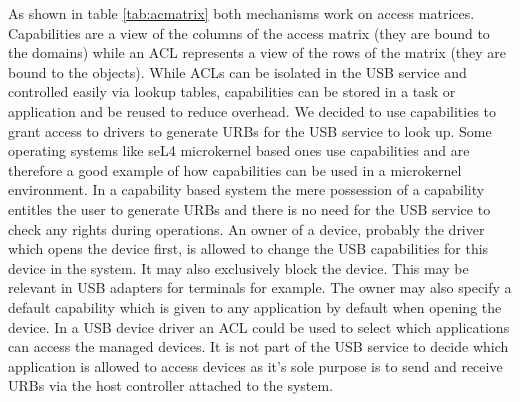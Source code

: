 \documentclass{acm_proc_article-sp}
\begin{document}
As shown in table \ref{tab:acmatrix} both mechanisms work on access matrices.
Capabilities are a view of the columns of the access matrix (they are bound to the domains) while
an ACL represents a view of the rows of the matrix (they are bound to the objects).
While ACLs can be isolated in the USB service and controlled easily via lookup tables,
capabilities can be stored in a task or application and be reused to reduce overhead.
We decided to use capabilities to grant access to drivers to generate URBs for the USB service
to look up.
Some operating systems like seL4 microkernel based ones \cite{sel4} use capabilities
and are therefore a good example of how capabilities can be used in a microkernel
environment.
In a capability based system the mere possession of a capability entitles
the user to generate URBs and there is no need for the USB service to
check any rights during operations.
An owner of a device, probably the driver which opens the device first,
is allowed to change the USB capabilities for this device in the system.
It may also exclusively block the device.
This may be relevant in USB adapters for terminals for example.
The owner may also specify a default capability which is given to any
application by default when opening the device.
In a USB device driver an ACL could be used to select which applications can access the managed
devices.
It is not part of the USB service to decide which application is allowed to access
devices as it's sole purpose is to send and receive URBs via the host controller attached
to the system.
\end{document}
